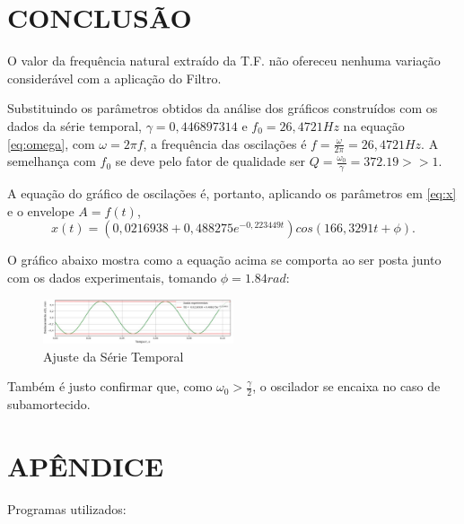 \documentclass[10pt,a4paper,twocolumn]{article}
\begin{document}
\section{CONCLUSÃO}
O valor da frequência natural extraído da T.F. não ofereceu nenhuma variação considerável com a aplicação do Filtro. 
\par Substituindo os parâmetros obtidos da análise dos gráficos construídos com os dados da série temporal, $\gamma=0,446897314$ e $f_0=26,4721 Hz$ na equação \ref{eq:omega}, com $\omega=2\pi f$, a frequência das oscilações é $f=\frac{\omega}{2\pi}=26,4721 Hz$. A semelhança com $f_0$ se deve pelo fator de qualidade ser $Q=\frac{\omega_0}{\gamma}=372.19 >>1$.
\par A equação do gráfico de oscilações é, portanto, aplicando os parâmetros em \ref{eq:x} e o envelope $A=f(t)$,
\begin{equation}
x(t)=(0,0216938+0,488275e^{-0,223449t})cos(166,3291t+\phi).
\end{equation}
\par O gráfico abaixo mostra como a equação acima se comporta ao ser posta junto com os dados experimentais, tomando $\phi = 1.84 rad$:
\begin{figure}[H]
\includegraphics[width=0.5\textwidth, left]{Ajuste}
\caption{Ajuste da Série Temporal}
\label{fig:ajuste}
\end{figure}
\par Também é justo confirmar que, como $\omega_0 > \frac{\gamma}{2}$, o oscilador se encaixa no caso de subamortecido.

\newpage
\nocite{ressonador, nave, carlos2018, numpydoc, matplotdoc, pandasdoc, scipydoc}


\section{APÊNDICE}
\par Programas utilizados:


\end{document}
